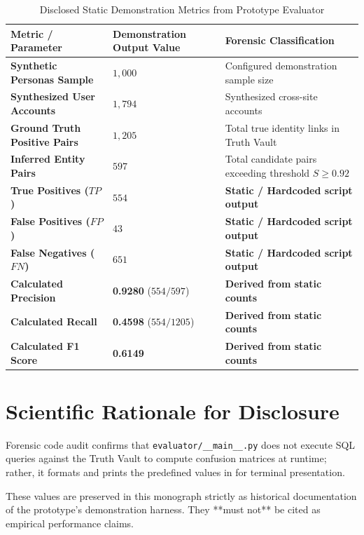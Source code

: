 \begin{table}[htbp]
\centering
\small
\caption{Disclosed Static Demonstration Metrics from Prototype Evaluator}
\label{tab:static-mock-metrics}
\begin{tabular}{@{}lll@{}}
\toprule
\textbf{Metric / Parameter} & \textbf{Demonstration Output Value} & \textbf{Forensic Classification} \\ \midrule
\textbf{Synthetic Personas Sample} & $1{,}000$ & Configured demonstration sample size \\
\textbf{Synthesized User Accounts} & $1{,}794$ & Synthesized cross-site accounts \\
\textbf{Ground Truth Positive Pairs} & $1{,}205$ & Total true identity links in Truth Vault \\
\textbf{Inferred Entity Pairs} & $597$ & Total candidate pairs exceeding threshold $S \ge 0.92$ \\
\textbf{True Positives ($TP$)} & $554$ & \textbf{Static / Hardcoded script output} \\
\textbf{False Positives ($FP$)} & $43$ & \textbf{Static / Hardcoded script output} \\
\textbf{False Negatives ($FN$)} & $651$ & \textbf{Static / Hardcoded script output} \\
\textbf{Calculated Precision} & \textbf{0.9280} ($554 / 597$) & \textbf{Derived from static counts} \\
\textbf{Calculated Recall} & \textbf{0.4598} ($554 / 1205$) & \textbf{Derived from static counts} \\
\textbf{Calculated F1 Score} & \textbf{0.6149} & \textbf{Derived from static counts} \\ \bottomrule
\end{tabular}
\end{table}

\section{Scientific Rationale for Disclosure}
Forensic code audit confirms that \texttt{evaluator/\_\_main\_\_.py} does not execute SQL queries against the Truth Vault to compute confusion matrices at runtime; rather, it formats and prints the predefined values in  for terminal presentation.

These values are preserved in this monograph strictly as historical documentation of the prototype's demonstration harness. They **must not** be cited as empirical performance claims.

